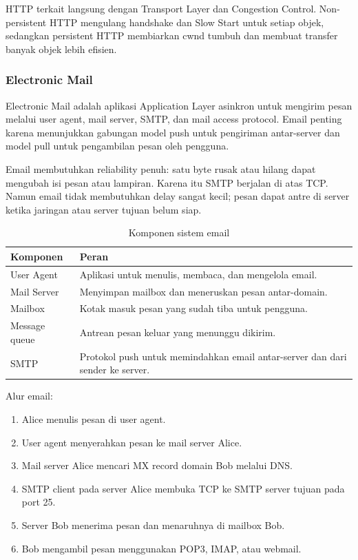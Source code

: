 HTTP terkait langsung dengan Transport Layer dan Congestion Control. Non-persistent HTTP mengulang handshake dan Slow Start untuk setiap objek, sedangkan persistent HTTP membiarkan cwnd tumbuh dan membuat transfer banyak objek lebih efisien.

\subsubsection{Electronic Mail}
\begin{jawab}
Electronic Mail adalah aplikasi Application Layer asinkron untuk mengirim pesan melalui user agent, mail server, SMTP, dan mail access protocol. Email penting karena menunjukkan gabungan model push untuk pengiriman antar-server dan model pull untuk pengambilan pesan oleh pengguna.
\end{jawab}

Email membutuhkan reliability penuh: satu byte rusak atau hilang dapat mengubah isi pesan atau lampiran. Karena itu SMTP berjalan di atas TCP. Namun email tidak membutuhkan delay sangat kecil; pesan dapat antre di server ketika jaringan atau server tujuan belum siap.

\begin{table}[H]
\centering
\begin{tabularx}{\textwidth}{|L{0.25\textwidth}|X|}
\hline
\textbf{Komponen} & \textbf{Peran} \\
\hline
User Agent & Aplikasi untuk menulis, membaca, dan mengelola email. \\
\hline
Mail Server & Menyimpan mailbox dan meneruskan pesan antar-domain. \\
\hline
Mailbox & Kotak masuk pesan yang sudah tiba untuk pengguna. \\
\hline
Message queue & Antrean pesan keluar yang menunggu dikirim. \\
\hline
SMTP & Protokol push untuk memindahkan email antar-server dan dari sender ke server. \\
\hline
\end{tabularx}
\caption{Komponen sistem email}
\label{tab:email-components}
\end{table}

Alur email:
\begin{enumerate}
    \item Alice menulis pesan di user agent.
    \item User agent menyerahkan pesan ke mail server Alice.
    \item Mail server Alice mencari MX record domain Bob melalui DNS.
    \item SMTP client pada server Alice membuka TCP ke SMTP server tujuan pada port 25.
    \item Server Bob menerima pesan dan menaruhnya di mailbox Bob.
    \item Bob mengambil pesan menggunakan POP3, IMAP, atau webmail.
\end{enumerate}

